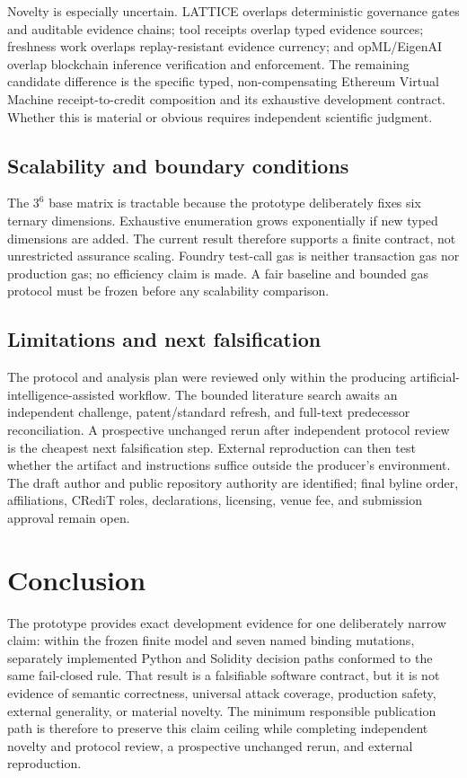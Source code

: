 \documentclass[utf8]{FrontiersinHarvard}
\begin{document}
Novelty is especially uncertain. LATTICE overlaps deterministic governance gates and auditable evidence chains; tool receipts overlap typed evidence sources; freshness work overlaps replay-resistant evidence currency; and opML/EigenAI overlap blockchain inference verification and enforcement. The remaining candidate difference is the specific typed, non-compensating Ethereum Virtual Machine receipt-to-credit composition and its exhaustive development contract. Whether this is material or obvious requires independent scientific judgment.

\subsection{Scalability and boundary conditions}

The $3^6$ base matrix is tractable because the prototype deliberately fixes six ternary dimensions. Exhaustive enumeration grows exponentially if new typed dimensions are added. The current result therefore supports a finite contract, not unrestricted assurance scaling. Foundry test-call gas is neither transaction gas nor production gas; no efficiency claim is made. A fair baseline and bounded gas protocol must be frozen before any scalability comparison.

\subsection{Limitations and next falsification}

The protocol and analysis plan were reviewed only within the producing artificial-intelligence-assisted workflow. The bounded literature search awaits an independent challenge, patent/standard refresh, and full-text predecessor reconciliation. A prospective unchanged rerun after independent protocol review is the cheapest next falsification step. External reproduction can then test whether the artifact and instructions suffice outside the producer's environment. The draft author and public repository authority are identified; final byline order, affiliations, CRediT roles, declarations, licensing, venue fee, and submission approval remain open.

\section{Conclusion}

The prototype provides exact development evidence for one deliberately narrow claim: within the frozen finite model and seven named binding mutations, separately implemented Python and Solidity decision paths conformed to the same fail-closed rule. That result is a falsifiable software contract, but it is not evidence of semantic correctness, universal attack coverage, production safety, external generality, or material novelty. The minimum responsible publication path is therefore to preserve this claim ceiling while completing independent novelty and protocol review, a prospective unchanged rerun, and external reproduction.
\end{document}
